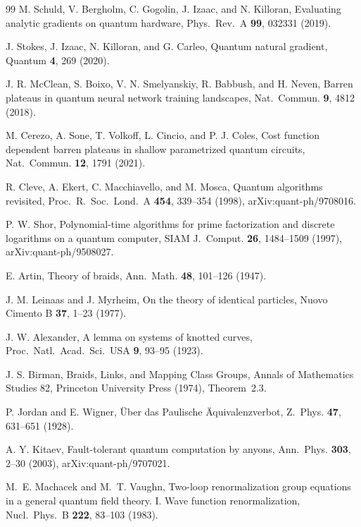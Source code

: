 \documentclass[aps,pra,onecolumn,superscriptaddress,nofootinbib,10pt]{revtex4-2}
\theoremstyle{definition}
\theoremstyle{remark}
\begin{document}
\begin{thebibliography}{99}
 M. Schuld, V. Bergholm, C. Gogolin, J. Izaac, and N. Killoran, Evaluating analytic gradients on quantum hardware, Phys.\ Rev.\ A \textbf{99}, 032331 (2019).

 J. Stokes, J. Izaac, N. Killoran, and G. Carleo, Quantum natural gradient, Quantum \textbf{4}, 269 (2020).

 J. R. McClean, S. Boixo, V. N. Smelyanskiy, R. Babbush, and H. Neven, Barren plateaus in quantum neural network training landscapes, Nat.\ Commun. \textbf{9}, 4812 (2018).

 M. Cerezo, A. Sone, T. Volkoff, L. Cincio, and P. J. Coles, Cost function dependent barren plateaus in shallow parametrized quantum circuits, Nat.\ Commun. \textbf{12}, 1791 (2021).

 R. Cleve, A. Ekert, C. Macchiavello, and M. Mosca, Quantum algorithms revisited, Proc.\ R.\ Soc.\ Lond.\ A \textbf{454}, 339--354 (1998), arXiv:quant-ph/9708016.

 P. W. Shor, Polynomial-time algorithms for prime factorization and discrete logarithms on a quantum computer, SIAM J.\ Comput. \textbf{26}, 1484--1509 (1997), arXiv:quant-ph/9508027.

 E. Artin, Theory of braids, Ann.\ Math. \textbf{48}, 101--126 (1947).

 J. M. Leinaas and J. Myrheim, On the theory of identical particles, Nuovo Cimento B \textbf{37}, 1--23 (1977).

 J. W. Alexander, A lemma on systems of knotted curves, Proc.\ Natl.\ Acad.\ Sci.\ USA \textbf{9}, 93--95 (1923).

 J. S. Birman, Braids, Links, and Mapping Class Groups, Annals of Mathematics Studies 82, Princeton University Press (1974), Theorem~2.3.

 P. Jordan and E. Wigner, \"Uber das Paulische \"Aquivalenzverbot, Z.\ Phys. \textbf{47}, 631--651 (1928).

 A. Y. Kitaev, Fault-tolerant quantum computation by anyons, Ann.\ Phys. \textbf{303}, 2--30 (2003), arXiv:quant-ph/9707021.

 M.~E. Machacek and M.~T. Vaughn, Two-loop renormalization group equations in a general quantum field theory. I. Wave function renormalization, Nucl.\ Phys.\ B \textbf{222}, 83--103 (1983).


\end{thebibliography}
\end{document}
